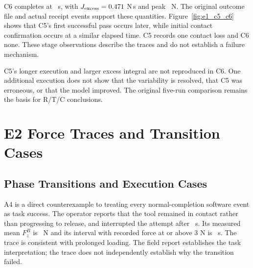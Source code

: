 C6 completes at \CsixTime~s, with \(J_{\mathrm{excess}}=0.471\) N\,s and peak \CsixPeak~N. The original outcome file and actual receipt events support these quantities. Figure~\ref{fig:e1_c5_c6} shows that C5's first successful pass occurs later, while initial contact confirmation occurs at a similar elapsed time. C5 records one contact loss and C6 none. These stage observations describe the traces and do not establish a failure mechanism.


C5's longer execution and larger excess integral are not reproduced in C6. One additional execution does not show that the variability is resolved, that C5 was erroneous, or that the model improved. The original five-run comparison remains the basis for R/T/C conclusions.


\section{E2 Force Traces and Transition Cases}
\subsection{Phase Transitions and Execution Cases}
A4 is a direct counterexample to treating every normal-completion software event as task success. The operator reports that the tool remained in contact rather than progressing to release, and interrupted the attempt after \AfourInterval~s. Its measured mean \(F_z^B\) is \AfourMeanForce~N and its interval with recorded force at or above 3 N is \AfourContactTime~s. The trace is consistent with prolonged loading. The field report establishes the task interpretation; the trace does not independently establish why the transition failed.


